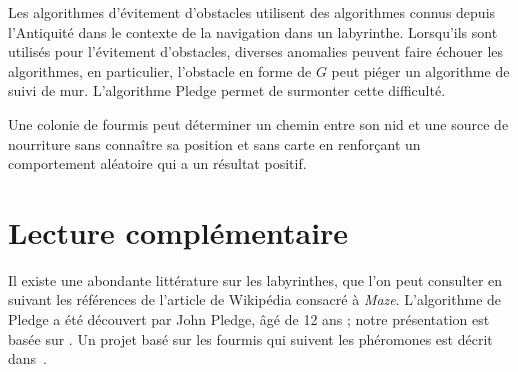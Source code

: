 Les algorithmes d'évitement d'obstacles utilisent des algorithmes connus depuis l'Antiquité dans le contexte de la navigation dans un labyrinthe. Lorsqu'ils sont utilisés pour l'évitement d'obstacles, diverses anomalies peuvent faire échouer les algorithmes, en particulier, l'obstacle en forme de $G$ peut piéger un algorithme de suivi de mur. L'algorithme Pledge permet de surmonter cette difficulté.

Une colonie de fourmis peut déterminer un chemin entre son nid et une source de nourriture sans connaître sa position et sans carte en renforçant un comportement aléatoire qui a un résultat positif.

\section{Lecture complémentaire}

Il existe une abondante littérature sur les labyrinthes, que l'on peut consulter en suivant les références de l'article de Wikipédia consacré à \emph{Maze}. L'algorithme de Pledge a été découvert par John Pledge, âgé de 12 ans ; notre présentation est basée sur \cite[Chap.~4]{turtle}. Un projet basé sur les fourmis qui suivent les phéromones est décrit dans~\cite{Mayet2010}.
